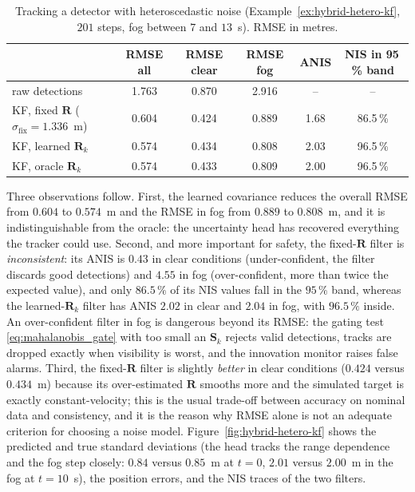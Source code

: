 \begin{example}
\begin{table}[!t]
    \centering
    \small
    \caption{Tracking a detector with heteroscedastic noise (Example~\ref{ex:hybrid-hetero-kf}, $201$ steps, fog between $7$ and $13$~s). RMSE in metres.}
    \label{tab:hetero-kf-results}
    \begin{tabular}{l c c c c c}
        \hline
        & \textbf{RMSE all} & \textbf{RMSE clear} & \textbf{RMSE fog} & \textbf{ANIS} & \textbf{NIS in 95\,\% band} \\
        \hline
        raw detections & 1.763 & 0.870 & 2.916 & -- & -- \\
        KF, fixed $\mathbf{R}$ ($\sigma_{\mathrm{fix}}=1.336$~m) & 0.604 & 0.424 & 0.889 & 1.68 & 86.5\,\% \\
        KF, learned $\mathbf{R}_k$ & 0.574 & 0.434 & 0.808 & 2.03 & 96.5\,\% \\
        KF, oracle $\mathbf{R}_k$ & 0.574 & 0.433 & 0.809 & 2.00 & 96.5\,\% \\
        \hline
    \end{tabular}
\end{table}
Three observations follow. First, the learned covariance reduces the overall RMSE from $0.604$ to $0.574$~m and the RMSE in fog from $0.889$ to $0.808$~m, and it is indistinguishable from the oracle: the uncertainty head has recovered everything the tracker could use. Second, and more important for safety, the fixed-$\mathbf{R}$ filter is \emph{inconsistent}: its ANIS is $0.43$ in clear conditions (under-confident, the filter discards good detections) and $4.55$ in fog (over-confident, more than twice the expected value), and only $86.5\,\%$ of its NIS values fall in the $95\,\%$ band, whereas the learned-$\mathbf{R}_k$ filter has ANIS $2.02$ in clear and $2.04$ in fog, with $96.5\,\%$ inside. An over-confident filter in fog is dangerous beyond its RMSE: the gating test \eqref{eq:mahalanobis_gate} with too small an $\mathbf{S}_k$ rejects valid detections, tracks are dropped exactly when visibility is worst, and the innovation monitor raises false alarms. Third, the fixed-$\mathbf{R}$ filter is slightly \emph{better} in clear conditions ($0.424$ versus $0.434$~m) because its over-estimated $\mathbf{R}$ smooths more and the simulated target is exactly constant-velocity; this is the usual trade-off between accuracy on nominal data and consistency, and it is the reason why RMSE alone is not an adequate criterion for choosing a noise model. Figure~\ref{fig:hybrid-hetero-kf} shows the predicted and true standard deviations (the head tracks the range dependence and the fog step closely: $0.84$ versus $0.85$~m at $t=0$, $2.01$ versus $2.00$~m in the fog at $t=10$~s), the position errors, and the NIS traces of the two filters.
\end{example}

